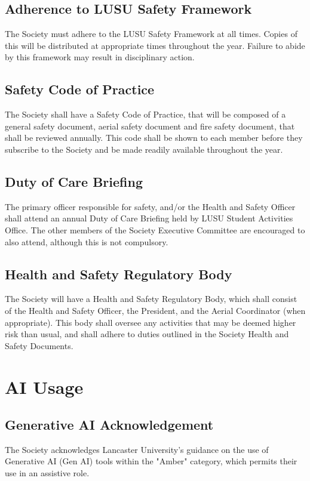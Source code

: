 \documentclass[11pt,a4paper]{article}
\begin{document}
\subsection{Adherence to LUSU Safety Framework}
The Society must adhere to the LUSU Safety Framework at all times. Copies of this will be distributed at appropriate times throughout the year. Failure to abide by this framework may result in disciplinary action.

\subsection{Safety Code of Practice}
The Society shall have a Safety Code of Practice, that will be composed of a general safety document, aerial safety document and fire safety document, that shall be reviewed annually. This code shall be shown to each member before they subscribe to the Society and be made readily available throughout the year.

\subsection{Duty of Care Briefing}
The primary officer responsible for safety, and/or the Health and Safety Officer shall attend an annual Duty of Care Briefing held by LUSU Student Activities Office. The other members of the Society Executive Committee are encouraged to also attend, although this is not compulsory.

\subsection{Health and Safety Regulatory Body}
The Society will have a Health and Safety Regulatory Body, which shall consist of the Health and Safety Officer, the President, and the Aerial Coordinator (when appropriate). This body shall oversee any activities that may be deemed higher risk than usual, and shall adhere to duties outlined in the Society Health and Safety Documents.

\section{AI Usage}\label{sec:ai}
\subsection{Generative AI Acknowledgement}
The Society acknowledges Lancaster University’s guidance on the use of Generative AI (Gen AI) tools within the "Amber" category, which permits their use in an assistive role.
\end{document}
